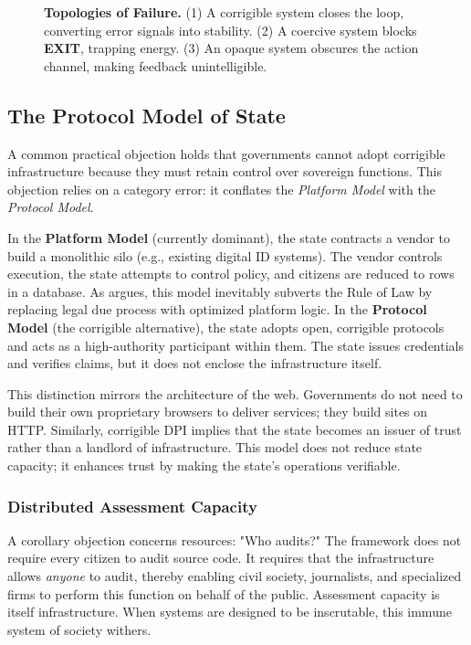\begin{figure}[htbp]
\caption{\textbf{Topologies of Failure.}
(1) A corrigible system closes the loop, converting error signals into stability.
(2) A coercive system blocks \textbf{EXIT}, trapping energy.
(3) An opaque system obscures the action channel, making feedback unintelligible.}
\label{fig:failure_modes}
\end{figure}

\subsection{The Protocol Model of State}

A common practical objection holds that governments cannot adopt corrigible infrastructure because they must retain control over sovereign functions. This objection relies on a category error: it conflates the \textit{Platform Model} with the \textit{Protocol Model}.

In the \textbf{Platform Model} (currently dominant), the state contracts a vendor to build a monolithic silo (e.g., existing digital ID systems). The vendor controls execution, the state attempts to control policy, and citizens are reduced to rows in a database. As \citet{cohen2019} argues, this model inevitably subverts the Rule of Law by replacing legal due process with optimized platform logic. In the \textbf{Protocol Model} (the corrigible alternative), the state adopts open, corrigible protocols and acts as a high-authority participant within them. The state issues credentials and verifies claims, but it does not enclose the infrastructure itself.

This distinction mirrors the architecture of the web. Governments do not need to build their own proprietary browsers to deliver services; they build sites on HTTP. Similarly, corrigible DPI implies that the state becomes an issuer of trust rather than a landlord of infrastructure. This model does not reduce state capacity; it enhances trust by making the state's operations verifiable.

\subsubsection{Distributed Assessment Capacity}
A corollary objection concerns resources: "Who audits?" The framework does not require every citizen to audit source code. It requires that the infrastructure allows \textit{anyone} to audit, thereby enabling civil society, journalists, and specialized firms to perform this function on behalf of the public. Assessment capacity is itself infrastructure. When systems are designed to be inscrutable, this immune system of society withers.

